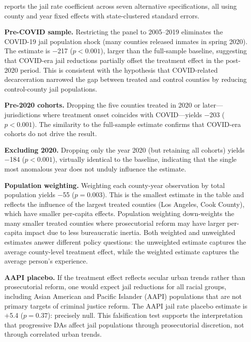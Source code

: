 \documentclass[12pt]{article}
\begin{document}
 reports the jail rate coefficient across seven alternative specifications, all using county and year fixed effects with state-clustered standard errors.

\textbf{Pre-COVID sample.} Restricting the panel to 2005--2019 eliminates the COVID-19 jail population shock (many counties released inmates in spring 2020). The estimate is $-$217 ($p < 0.001$), larger than the full-sample baseline, suggesting that COVID-era jail reductions partially offset the treatment effect in the post-2020 period. This is consistent with the hypothesis that COVID-related decarceration narrowed the gap between treated and control counties by reducing control-county jail populations.

\textbf{Pre-2020 cohorts.} Dropping the five counties treated in 2020 or later---jurisdictions where treatment onset coincides with COVID---yields $-$203 ($p < 0.001$). The similarity to the full-sample estimate confirms that COVID-era cohorts do not drive the result.

\textbf{Excluding 2020.} Dropping only the year 2020 (but retaining all cohorts) yields $-$184 ($p < 0.001$), virtually identical to the baseline, indicating that the single most anomalous year does not unduly influence the estimate.

\textbf{Population weighting.} Weighting each county-year observation by total population yields $-$55 ($p = 0.003$). This is the smallest estimate in the table and reflects the influence of the largest treated counties (Los Angeles, Cook County), which have smaller per-capita effects. Population weighting down-weights the many smaller treated counties where prosecutorial reform may have larger per-capita impact due to less bureaucratic inertia. Both weighted and unweighted estimates answer different policy questions: the unweighted estimate captures the average county-level treatment effect, while the weighted estimate captures the average person's experience.

\textbf{AAPI placebo.} If the treatment effect reflects secular urban trends rather than prosecutorial reform, one would expect jail reductions for all racial groups, including Asian American and Pacific Islander (AAPI) populations that are not primary targets of criminal justice reform. The AAPI jail rate placebo estimate is $+$5.4 ($p = 0.37$): precisely null. This falsification test supports the interpretation that progressive DAs affect jail populations through prosecutorial discretion, not through correlated urban trends.
\end{document}

